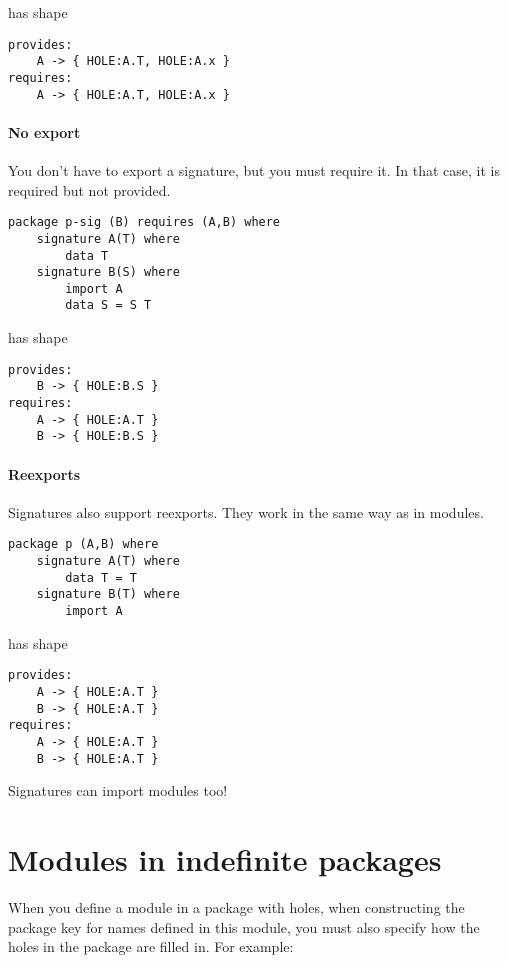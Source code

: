 \documentclass{article}
\begin{document}
has shape

\begin{verbatim}
provides:
    A -> { HOLE:A.T, HOLE:A.x }
requires:
    A -> { HOLE:A.T, HOLE:A.x }
\end{verbatim}

\paragraph{No export}  You don't have to export a signature,
but you must require it.  In that case, it is required but
not provided.

\begin{verbatim}
package p-sig (B) requires (A,B) where
    signature A(T) where
        data T
    signature B(S) where
        import A
        data S = S T
\end{verbatim}

has shape

\begin{verbatim}
provides:
    B -> { HOLE:B.S }
requires:
    A -> { HOLE:A.T }
    B -> { HOLE:B.S }
\end{verbatim}

\paragraph{Reexports}  Signatures also support reexports. They
work in the same way as in modules.

\begin{verbatim}
package p (A,B) where
    signature A(T) where
        data T = T
    signature B(T) where
        import A
\end{verbatim}

has shape

\begin{verbatim}
provides:
    A -> { HOLE:A.T }
    B -> { HOLE:A.T }
requires:
    A -> { HOLE:A.T }
    B -> { HOLE:A.T }
\end{verbatim}

Signatures can import modules too!

\section{Modules in indefinite packages}

When you define a module in a package with holes, when constructing
the package key for names defined in this module, you must also specify
how the holes in the package are filled in.  For example:
\end{document}
